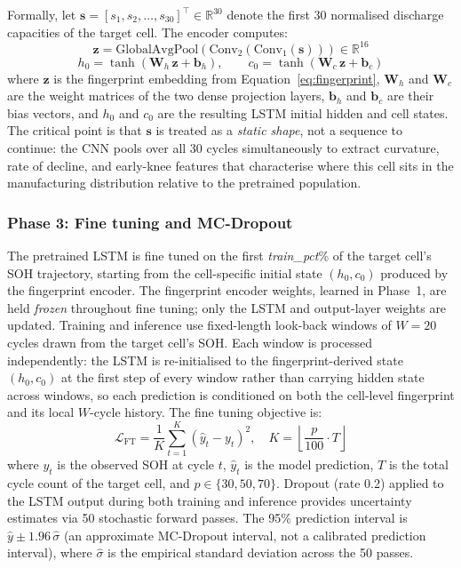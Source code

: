 Formally, let $\mathbf{s} = [s_1, s_2, \ldots, s_{30}]^{\top} \in \mathbb{R}^{30}$
denote the first 30 normalised discharge capacities of the target cell.
The encoder computes:
\begin{equation}
  \mathbf{z} = \mathrm{GlobalAvgPool}\!\left(
    \mathrm{Conv}_2\!\left(\mathrm{Conv}_1(\mathbf{s})\right)
  \right) \in \mathbb{R}^{16}
  \label{eq:fingerprint}
\end{equation}
\begin{equation}
  h_0 = \tanh(\mathbf{W}_h\,\mathbf{z} + \mathbf{b}_h), \qquad
  c_0 = \tanh(\mathbf{W}_c\,\mathbf{z} + \mathbf{b}_c)
  \label{eq:h0c0}
\end{equation}
where $\mathbf{z}$ is the fingerprint embedding from Equation~\eqref{eq:fingerprint},
$\mathbf{W}_h$ and $\mathbf{W}_c$ are the weight matrices of the two dense
projection layers, $\mathbf{b}_h$ and $\mathbf{b}_c$ are their bias vectors, and
$h_0$ and $c_0$ are the resulting LSTM initial hidden and cell states.
The critical point is that $\mathbf{s}$ is treated as a \textit{static shape},
not a sequence to continue: the CNN pools over all 30 cycles simultaneously to
extract curvature, rate of decline, and early-knee features that characterise
where this cell sits in the manufacturing distribution relative to the
pretrained population.

\subsubsection{Phase 3: Fine tuning and MC-Dropout}
The pretrained LSTM is fine tuned
on the first \textit{train\_pct}\% of the target cell's SOH trajectory,
starting from the cell-specific initial state $(h_0, c_0)$ produced by the
fingerprint encoder.
The fingerprint encoder weights, learned in Phase~1, are held \textit{frozen}
throughout fine tuning; only the LSTM and output-layer weights are updated.
Training and inference use fixed-length look-back windows of $W=20$ cycles drawn
from the target cell's SOH. Each window is processed independently: the LSTM is
re-initialised to the fingerprint-derived state $(h_0, c_0)$ at the first step of
every window rather than carrying hidden state across windows, so each prediction
is conditioned on both the cell-level fingerprint and its local $W$-cycle history.
The fine tuning objective is:
\begin{equation}
  \mathcal{L}_{\mathrm{FT}} = \frac{1}{K}\sum_{t=1}^{K}\!\left(\hat{y}_t - y_t\right)^2,
  \quad K = \left\lfloor \frac{p}{100} \cdot T \right\rfloor
  \label{eq:ft_loss}
\end{equation}
where $y_t$ is the observed SOH at cycle $t$, $\hat{y}_t$ is the model
prediction, $T$ is the total cycle count of the target cell, and $p \in
\{30, 50, 70\}$.
Dropout (rate 0.2) applied to the LSTM output during both training and
inference provides uncertainty estimates via 50 stochastic forward passes.
The 95\% prediction interval is $\hat{y} \pm 1.96\,\hat{\sigma}$ (an approximate
MC-Dropout interval, not a calibrated prediction interval), where $\hat{\sigma}$
is the empirical standard deviation across the 50 passes.

